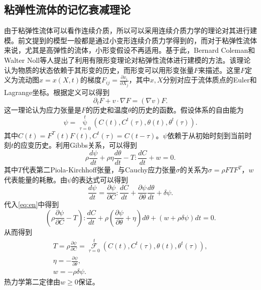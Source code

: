 \subsection{粘弹性流体的记忆衰减理论}
由于粘弹性流体可以看作连续介质，所以可以采用连续介质力学的理论对其进行建模。前文提到的模型一般都是通过小变形连续介质力学得到的，而对于粘弹性流体来说，尤其是高弹性的流体，小形变假设不再适用。基于此，Bernard Coleman和Walter Noll等人提出了利用有限形变理论对粘弹性流体进行建模的方法\cite{coleman1961foundations,coleman1964thermodynamics,coleman2012viscometric}。该理论认为物质的状态依赖于其形变的历史，而形变可以用形变张量$F$来描述。这里$F$定义为流动图$x = x(X,t)$的梯度$F_{ij} = \frac{\partial x_i}{\partial X_j}$，其中$x,X$分别对应于流体质点的Euler和Lagrange坐标。根据定义可以得到
\begin{equation}\label{eq:Feq}
	\partial_t F + v \cdot \nabla F = (\nabla v) F.
\end{equation}
这一理论认为应力张量是$F$的历史和温度$\theta$的历史的函数。假设体系的自由能为
\begin{equation*}
	\psi = \mathop{\psi} \limits_{\tau=0}^{t}( C(t), C^t(\tau),\theta(t),\theta^t(\tau)).
\end{equation*}
其中$C(t) = F^T(t) F(t),C^t(\tau) = C(t - \tau)$。$\psi$依赖于从初始时刻到当前时刻$t$的应变历史。利用Gibbs关系，可以得到
\begin{equation}\label{eq:en}
	\rho \frac{d\psi}{dt} + \rho \eta \frac{d \theta}{dt} - T: \frac{dC}{dt} + w = 0.
\end{equation}
其中$T$代表第二Piola-Kirchhoff张量，与Cauchy应力张量$\sigma$的关系为$\sigma = \rho F T F^T$，$w$代表能量的耗散。由$\psi$的表达式可以得到
\begin{equation*}
	\frac{d\psi}{dt} = \frac{\partial \psi}{\partial C} : \frac{d C}{dt}+ \frac{\partial \psi}{\partial \theta} \frac{d\theta}{dt} + \delta \psi.
\end{equation*}
代入\eqref{eq:en}中得到
\begin{equation*}
	(\rho \frac{\partial \psi}{\partial C} - T) : \frac{dC}{dt} + \rho (\frac{\partial \psi}{\partial \theta} + \eta) d\theta + (w + \rho \delta \psi) dt  =0.
\end{equation*}
从而得到
\begin{eqnarray*}
	T = \rho \frac{\partial \psi}{\partial C} = \mathop{\mathcal{F}}\limits_{\tau=0}^{t} ( C(t), C^t(\tau),\theta(t),\theta^t(\tau)), \\
	\eta = -\frac{\partial \psi}{\partial \theta},\\
	w = -\rho \delta \psi.
\end{eqnarray*}
热力学第二定律由$w \ge 0$保证\cite{coleman1961foundations,dimitrienko2010nonlinear}。

